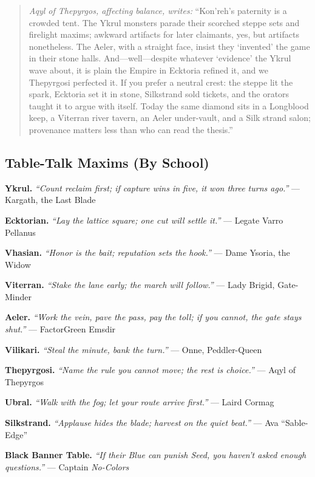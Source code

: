 \documentclass[11pt]{article}
\begin{document}
\begin{quote}\small
\textit{Aqyl of Thepyrgos, affecting balance, writes:} “Kon'reh’s paternity is a crowded tent. The Ykrul monsters parade their scorched steppe sets and firelight maxims; awkward artifacts for later claimants, yes, but artifacts nonetheless. The Aeler, with a straight face, insist they ‘invented’ the game in their stone halls. And—well—despite whatever ‘evidence’ the Ykrul wave about, it is plain the Empire in Ecktoria refined it, and we Thepyrgosi perfected it. If you prefer a neutral crest: the steppe lit the spark, Ecktoria set it in stone, Silkstrand sold tickets, and the orators taught it to argue with itself. Today the same diamond sits in a Longblood keep, a Viterran river tavern, an Aeler under-vault, and a Silk strand salon; provenance matters less than who can read the thesis.” 
\end{quote}
\medskip
\subsection*{Table-Talk Maxims (By School)}
\noindent\textbf{Ykrul.} \textit{“Count reclaim first; if capture wins in five, it won three turns ago.”} — Kargath, the Last Blade

\noindent\textbf{Ecktorian.} \textit{“Lay the lattice square; one cut will settle it.”} — Legate Varro Pellanus

\noindent\textbf{Vhasian.} \textit{“Honor is the bait; reputation sets the hook.”} — Dame Ysoria, the Widow

\noindent\textbf{Viterran.} \textit{“Stake the lane early; the march will follow.”} — Lady Brigid, Gate-Minder

\noindent\textbf{Aeler.} \textit{“Work the vein, pave the pass, pay the toll; if you cannot, the gate stays shut.”} — Factor\textendash Green Emsdir

\noindent\textbf{Vilikari.} \textit{“Steal the minute, bank the turn.”} — Onne, Peddler-Queen

\noindent\textbf{Thepyrgosi.} \textit{“Name the rule you cannot move; the rest is choice.”} — Aqyl of Thepyrgos

\noindent\textbf{Ubral.} \textit{“Walk with the fog; let your route arrive first.”} — Laird Cormag

\noindent\textbf{Silkstrand.} \textit{“Applause hides the blade; harvest on the quiet beat.”} — Ava “Sable-Edge”

\noindent\textbf{Black Banner Table.} \textit{“If their Blue can punish Seed, you haven’t asked enough questions.”} — Captain \emph{No-Colors}
\end{document}
